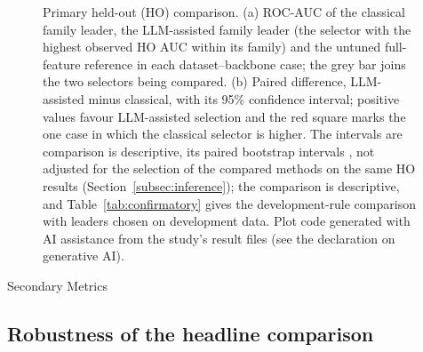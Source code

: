 \documentclass[final,5p,twocolumn]{elsarticle}
\providecommand{\DIFaddtex}[1]{{\protect\color{blue} \sf #1}} %
\providecommand{\DIFdeltex}[1]{{\protect\color{red} \scriptsize #1}} %
\providecommand{\DIFaddbegin}{} %
\providecommand{\DIFaddend}{} %
\providecommand{\DIFdelbegin}{} %
\providecommand{\DIFdelend}{} %
\providecommand{\DIFaddFL}[1]{\DIFadd{#1}} %
\providecommand{\DIFdelFL}[1]{\DIFdel{#1}} %
\providecommand{\DIFaddbeginFL}{} %
\providecommand{\DIFaddendFL}{} %
\providecommand{\DIFdelbeginFL}{} %
\providecommand{\DIFdelendFL}{} %
\providecommand{\DIFadd}[1]{\texorpdfstring{\DIFaddtex{#1}}{#1}} %
\providecommand{\DIFdel}[1]{\texorpdfstring{\DIFdeltex{#1}}{}} %
\begin{document}
\begin{figure}[htbp]
\caption{Primary held-out (HO) comparison. (a) ROC-AUC of the classical family leader, the LLM-assisted family leader (the selector with the highest observed HO AUC within its family) and the untuned full-feature reference in each dataset--backbone case; the grey bar joins the two selectors being compared. (b) Paired difference, LLM-assisted minus classical, with its 95\% confidence interval; positive values favour LLM-assisted selection and the red square marks the one case in which the classical selector is higher. The \DIFdelbeginFL \DIFdelFL{intervals are }\DIFdelendFL \DIFaddbeginFL \DIFaddFL{comparison is descriptive, its }\DIFaddendFL paired bootstrap intervals \DIFdelbeginFL \DIFdelFL{, }\DIFdelendFL not adjusted for the selection of the compared methods on the same HO results \DIFaddbeginFL \DIFaddFL{(Section~\ref{subsec:inference})}\DIFaddendFL ; \DIFdelbeginFL \DIFdelFL{the comparison is descriptive, and }\DIFdelendFL Table~\ref{tab:confirmatory} gives the development-rule comparison\DIFdelbeginFL \DIFdelFL{with leaders chosen on development data}\DIFdelendFL . Plot code generated with AI assistance from the study's result files (see the declaration on generative AI).}
\label{fig:primary}
\end{figure}

\DIFdelbegin %
\DIFdel{Secondary Metrics}%
\DIFdelend \DIFaddbegin \subsection{\DIFadd{Robustness of the headline comparison}}
\label{subsec:robustness}
\DIFaddend 
\end{document}
